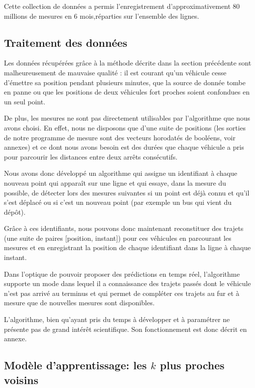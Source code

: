 \documentclass[letterpaper]{article}
\begin{document}
Cette collection de données a permis l'enregistrement d'approximativement 80 millions de mesures en 6 mois,réparties sur l'ensemble des lignes.


\subsection{Traitement des données}

Les données récupérées grâce à la méthode décrite dans la section précédente sont malheureusement de mauvaise qualité : il est courant qu'un véhicule cesse d’émettre sa position pendant plusieurs minutes, que la source de donnée tombe en panne ou que les positions de deux véhicules fort proches soient confondues en un seul point.

De plus, les mesures ne sont pas directement utilisables par l'algorithme que nous avons choisi. En effet, nous ne disposons que d'une suite de positions (les sorties de notre programme de mesure sont des vecteurs horodatés de booléens, voir annexes) et ce dont nous avons besoin est des durées que chaque véhicule a pris pour parcourir les distances entre deux arrêts consécutifs.

Nous avons donc développé un algorithme qui assigne un identifiant à chaque nouveau point qui apparaît sur une ligne et qui essaye, dans la mesure du possible, de détecter lors des mesures suivantes si un point est déjà connu et qu'il s'est déplacé ou si c'est un nouveau point (par exemple un bus qui vient du dépôt).

Grâce à ces identifiants, nous pouvons donc maintenant reconstituer des trajets (une suite de paires [position, instant]) pour ces véhicules en parcourant les mesures et en enregistrant la position de chaque identifiant dans la ligne à chaque instant.

Dans l'optique de pouvoir proposer des prédictions en temps réel, l'algorithme supporte un mode dans lequel il a connaissance des trajets passés dont le véhicule n'est pas arrivé au terminus et qui permet de compléter ces trajets au fur et à mesure que de nouvelles mesures sont disponibles.

L'algorithme, bien qu'ayant pris du temps à développer et à paramétrer ne présente pas de grand intérêt scientifique. Son fonctionnement est donc décrit en annexe.

\subsection{Modèle d'apprentissage: les $k$ plus proches voisins}
\end{document}
